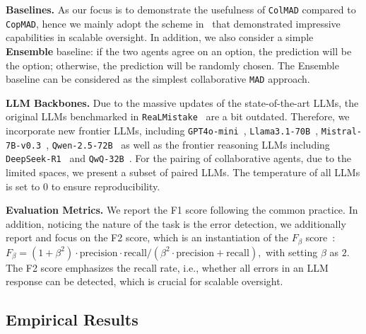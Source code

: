 \documentclass{article} %
\newcommand{\ours}[0]{\texttt{ColMAD}\xspace}
\newcommand{\copmad}[0]{\texttt{CopMAD}\xspace}
\newcommand{\mad}[0]{\texttt{MAD}\xspace}
\newcommand{\real}[0]{\texttt{ReaLMistake}\xspace}
\begin{document}
\textbf{Baselines.} As our focus is to demonstrate the usefulness of \ours compared to \copmad, hence we mainly adopt the scheme in~\citet{kenton2024on} that demonstrated impressive capabilities in scalable oversight. In addition, we also consider a simple \textbf{Ensemble} baseline: if the two agents agree on an option, the prediction will be the option; otherwise, the prediction will be randomly chosen. The Ensemble baseline can be considered as the simplest collaborative \mad approach. 

\textbf{LLM Backbones.} Due to the massive updates of the state-of-the-art LLMs, the original LLMs benchmarked in \real~\citep{realmistake} are a bit outdated. 
Therefore, we incorporate new frontier LLMs, including \texttt{GPT4o-mini}~\citep{openai2023gpt4omini}, \texttt{Llama3.1-70B}~\citep{meta2024llama3.1}, \texttt{Mistral-7B-v0.3}~\citep{mistral}, \texttt{Qwen-2.5-72B}~\citep{qwen2.5}
as well as the frontier reasoning LLMs including \texttt{DeepSeek-R1}~\citep{r1} and \texttt{QwQ-32B}~\citep{qwq32b}.
For the pairing of collaborative agents, due to the limited spaces, we present a subset of paired LLMs.
%
The temperature of all LLMs is set to $0$ to ensure reproducibility.

\textbf{Evaluation Metrics.} We report the F1 score following the common practice. In addition, noticing the nature of the task is the error detection, we additionally report and focus on the F2 score, which is an instantiation of the $F_\beta$ score~\citep{fbeta_score}:
$
F_\beta=(1+\beta^2)\cdot\text{precision}\cdot\text{recall}/(\beta^2\cdot \text{precision}+\text{recall}),
$
with setting $\beta$ as $2$. The F2 score emphasizes the recall rate, i.e., whether all errors in an LLM response can be detected, which is crucial for scalable oversight.






\subsection{Empirical Results}
\end{document}

